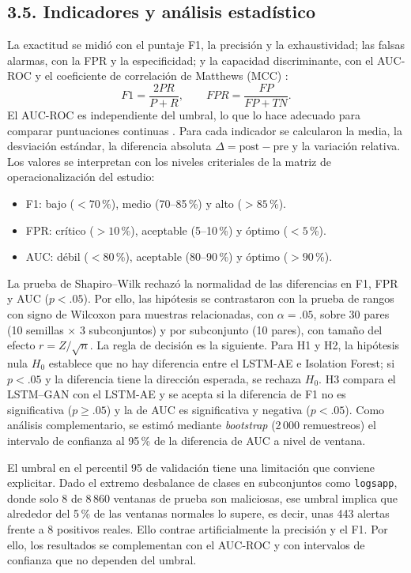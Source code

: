\documentclass[jou,a4paper,floatsintext,donotrepeattitle]{apa7}
\begin{document}
\subsection{3.5. Indicadores y análisis estadístico}
La exactitud se midió con el puntaje F1, la precisión y la exhaustividad; las falsas alarmas, con la FPR y la especificidad; y la capacidad discriminante, con el AUC-ROC y el coeficiente de correlación de Matthews (MCC) \parencite{almodovar2024,zhang2025}:
\begin{equation}
F1 = \frac{2PR}{P+R}, \qquad FPR = \frac{FP}{FP+TN}.
\label{eq:metricas}
\end{equation}
El AUC-ROC es independiente del umbral, lo que lo hace adecuado para comparar puntuaciones continuas \parencite{gorokhov2023}. Para cada indicador se calcularon la media, la desviación estándar, la diferencia absoluta $\Delta = \text{post} - \text{pre}$ y la variación relativa. Los valores se interpretan con los niveles criteriales de la matriz de operacionalización del estudio:
\begin{itemize}
  \item F1: bajo ($< 70$\,\%), medio (70--85\,\%) y alto ($> 85$\,\%).
  \item FPR: crítico ($> 10$\,\%), aceptable (5--10\,\%) y óptimo ($< 5$\,\%).
  \item AUC: débil ($< 80$\,\%), aceptable (80--90\,\%) y óptimo ($> 90$\,\%).
\end{itemize}

La prueba de Shapiro–Wilk rechazó la normalidad de las diferencias en F1, FPR y AUC ($p < .05$). Por ello, las hipótesis se contrastaron con la prueba de rangos con signo de Wilcoxon para muestras relacionadas, con $\alpha = .05$, sobre 30 pares (10 semillas $\times$ 3 subconjuntos) y por subconjunto (10 pares), con tamaño del efecto $r = Z/\sqrt{n}$. La regla de decisión es la siguiente. Para H1 y H2, la hipótesis nula $H_0$ establece que no hay diferencia entre el LSTM-AE e Isolation Forest; si $p < .05$ y la diferencia tiene la dirección esperada, se rechaza $H_0$. H3 compara el LSTM--GAN con el LSTM-AE y se acepta si la diferencia de F1 no es significativa ($p \geq .05$) y la de AUC es significativa y negativa ($p < .05$). Como análisis complementario, se estimó mediante \textit{bootstrap} (2\,000 remuestreos) el intervalo de confianza al 95\,\% de la diferencia de AUC a nivel de ventana.

El umbral en el percentil 95 de validación tiene una limitación que conviene explicitar. Dado el extremo desbalance de clases en subconjuntos como \texttt{logsapp}, donde solo 8 de 8\,860 ventanas de prueba son maliciosas, ese umbral implica que alrededor del 5\,\% de las ventanas normales lo supere, es decir, unas 443 alertas frente a 8 positivos reales. Ello contrae artificialmente la precisión y el F1. Por ello, los resultados se complementan con el AUC-ROC y con intervalos de confianza que no dependen del umbral.
\end{document}
